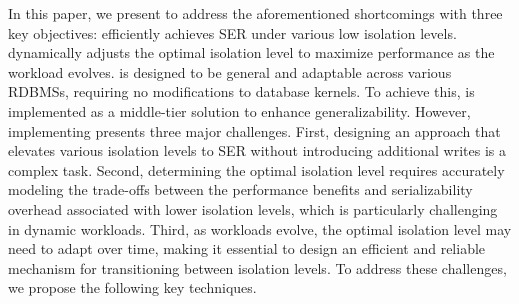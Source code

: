 

In this paper, we present \sysname to address the aforementioned shortcomings with three key objectives:
 \sysname efficiently achieves SER under various low isolation levels.
 \sysname dynamically adjusts the optimal isolation level to maximize performance as the workload evolves.
 \sysname is designed to be general and adaptable across various RDBMSs, requiring no modifications to database kernels. To achieve this, \sysname is implemented as a middle-tier solution to enhance generalizability. 
However, implementing \sysname presents three major challenges. First, designing an approach that elevates various isolation levels to SER without introducing additional writes is a complex task. Second, determining the optimal isolation level requires accurately modeling the trade-offs between the performance benefits and serializability overhead associated with lower isolation levels, which is particularly challenging in dynamic workloads. Third, as workloads evolve, the optimal isolation level may need to adapt over time, making it essential to design an efficient and reliable mechanism for transitioning between isolation levels.
To address these challenges, we propose the following key techniques.


